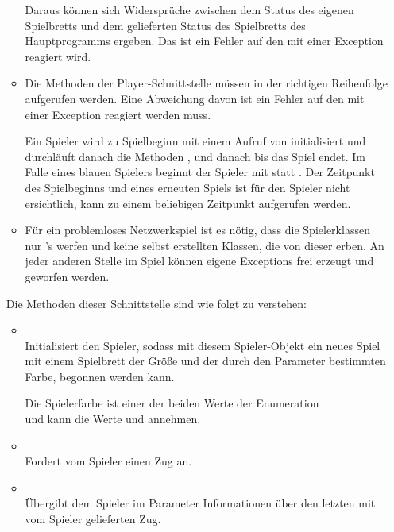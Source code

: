 \begin{enumerate}
\begin{itemize}
Daraus können sich Widersprüche zwischen dem Status des eigenen Spielbretts und dem gelieferten Status des Spielbretts des Hauptprogramms ergeben. Das ist ein Fehler auf den mit einer Exception reagiert wird.

\item Die Methoden der Player-Schnittstelle müssen in der richtigen Reihenfolge aufgerufen werden. Eine Abweichung davon ist ein Fehler auf den mit einer Exception reagiert werden muss.

Ein Spieler wird zu Spielbeginn mit einem Aufruf von  initialisiert und durchläuft danach die Methoden ,  und danach  bis das Spiel endet. Im Falle eines blauen Spielers beginnt der Spieler mit  statt . Der Zeitpunkt des Spielbeginns und eines erneuten Spiels ist für den Spieler nicht ersichtlich,  kann zu einem beliebigen Zeitpunkt aufgerufen werden.

\item Für ein problemloses Netzwerkspiel ist es nötig, dass die Spielerklassen nur 's werfen und keine selbst erstellten Klassen, die von dieser erben. An jeder anderen Stelle im Spiel können eigene Exceptions frei erzeugt und geworfen werden.
\end{itemize}

Die Methoden dieser Schnittstelle sind wie folgt zu verstehen:

\begin{itemize}[leftmargin=4em]
\item[\code{init}] \hfill \\Initialisiert den Spieler, sodass mit diesem Spieler-Objekt ein neues Spiel mit einem Spielbrett der Größe  und der durch den Parameter  bestimmten Farbe, begonnen werden kann.

Die Spielerfarbe ist einer der beiden Werte der Enumeration \\
 und kann die Werte  und  annehmen.
\item[\code{request}] \hfill \\Fordert vom Spieler einen Zug an.
\item[\code{confirm}] \hfill \\Übergibt dem Spieler im Parameter  Informationen über den letzten mit  vom Spieler gelieferten Zug.


\end{itemize}
\end{enumerate}

